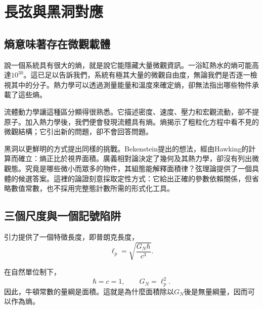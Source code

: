 \chapter{長弦與黑洞對應}


\section{熵意味著存在微觀載體}

說一個系統具有很大的熵，就是說它能隱藏大量微觀資訊。一浴缸熱水的熵可能高達\(10^{30}\)。這已足以告訴我們，系統有極其大量的微觀自由度，無論我們是否逐一檢視其中的分子。熱力學可以透過測量能量和溫度來確定熵，卻無法指出哪些物件承載了這些熵。

流體動力學讓這種區分顯得很熟悉。它描述密度、速度、壓力和宏觀流動，卻不提原子。加入熱力學後，我們便會發現流體具有熵。熵揭示了粗粒化方程中看不見的微觀結構；它引出新的問題，卻不會回答問題。

黑洞以更鮮明的方式提出同樣的挑戰。Bekenstein提出的想法，經由Hawking的計算而確立：熵正比於視界面積。廣義相對論決定了幾何及其熱力學，卻沒有列出微觀態。究竟是哪些微小而眾多的物件，其組態能解釋面積律？弦理論提供了一個具體的候選答案。這裡的論證刻意採取定性方式：它給出正確的參數依賴關係，但省略數值常數，也不採用完整態計數所需的形式化工具。

\section{三個尺度與一個記號陷阱}

引力提供了一個特徵長度，即普朗克長度，
\begin{equation}
\ell_p=\sqrt{\frac{G_N\hbar}{c^3}}.
\label{eq:l06-planck-si}
\end{equation}

\begin{classroomqa}
\end{classroomqa}

在自然單位制下，
\begin{equation}
\hbar=c=1,
\qquad
G_N=\ell_p^2.
\label{eq:l06-planck-area}
\end{equation}
因此，牛頓常數的量綱是面積。這就是為什麼面積除以\(G_N\)後是無量綱量，因而可以作為熵。

